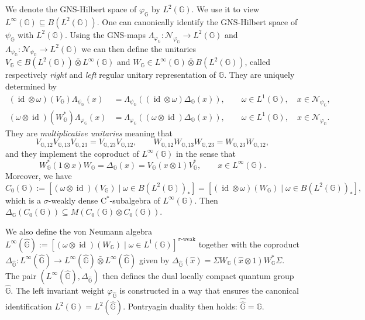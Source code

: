 \documentclass[reqno]{amsart}
\numberwithin{equation}{section}
\DeclareMathOperator{\id}{\mathrm{id}}
\newcommand{\G}{\mathbb{G}}
\newcommand{\ovot}{\bar{\otimes}}
\begin{document}
We denote the GNS-Hilbert space of $\varphi_\G$ by $L^2(\G)$. We use it to view $L^\infty(\G)\subseteq B(L^2(\G))$. One can canonically identify the GNS-Hilbert space of $\psi_\G$ with $L^2(\G)$. Using the GNS-maps
$\Lambda_{\varphi_\G}: \mathscr{N}_{\varphi_\G}\to L^2(\G)$ and  $\Lambda_{\psi_\G}: \mathscr{N}_{\psi_\G}\to L^2(\G)$
we can then define the unitaries 
$V_\G\in B(L^2(\G))\ovot L^ \infty(\G)$ and $W_\G \in L^\infty(\G)\ovot B(L^2(\G))$, 
called respectively \emph{right} and \emph{left} regular unitary representation of $\G$. They are uniquely determined by
\begin{align*}
(\id\otimes \omega)(V_\G) \Lambda_{\psi_\G}(x) &= \Lambda_{\psi_\G}((\id\otimes \omega)\Delta_\G(x)),
\qquad \omega \in L^1(\G),\quad x\in \mathscr{N}_{\psi_\G},\\
(\omega \otimes \id)(W_{\G}^*)\Lambda_{\varphi_\G}(x) &= \Lambda_{\varphi_\G}((\omega\otimes \id)\Delta_\G(x)),\qquad \omega \in L^1(\G),\quad x\in \mathscr{N}_{\varphi_\G}.
\end{align*} They are \emph{multiplicative unitaries} meaning that
\[
V_{\G,12}V_{\G,13}V_{\G,23} = V_{\G,23}V_{\G,12},\qquad W_{\G,12}W_{\G,13}W_{\G,23}= W_{\G,23}W_{\G,12},
\]
and they implement the coproduct of $L^\infty(\G)$ in the sense that
$$\label{EqComultImpl}
W_\G^*(1\otimes x)W_\G = \Delta_\G(x) = V_\G(x\otimes 1)V_\G^*,\qquad x\in L^\infty(\G).$$
Moreover, we have
$C_0(\G):=[(\omega\otimes \id)(V_\G) \mid \omega \in B(L^2(\G))_*] = [(\id\otimes \omega)(W_\G) \mid \omega \in B(L^2(\G))_*],$
which is a $\sigma$-weakly dense C$^*$-subalgebra of $L^\infty(\G)$. Then $\Delta_\G(C_0(\G))\subseteq M(C_0(\G)\otimes C_0(\G))$. 

We also define the von Neumann algebra
    $L^\infty(\hat{\G}) := [(\omega\otimes \id)(W_\G) \mid \omega \in L^1(\G)]^{\sigma\textrm{-weak}}$ together with the coproduct
$\Delta_{\hat{\G}}: L^\infty(\hat{\G})\to L^\infty(\hat{\G})\ovot L^\infty(\hat{\G})$ given by $\Delta_{\hat{\G}}(\hat{x})= \Sigma W_\G(\hat{x}\otimes 1)W_\G^*\Sigma.$
The pair $(L^\infty(\hat{\G}), \Delta_{\hat{\G}})$ then defines the dual locally compact quantum group $\hat{\G}$. The left invariant weight $\varphi_{\hat{\G}}$ is constructed in a way that ensures the canonical identification $L^2(\G)= L^2(\hat{\G})$. Pontryagin duality then holds: $\hat{\hat{\G}}= \G$.
\end{document}
